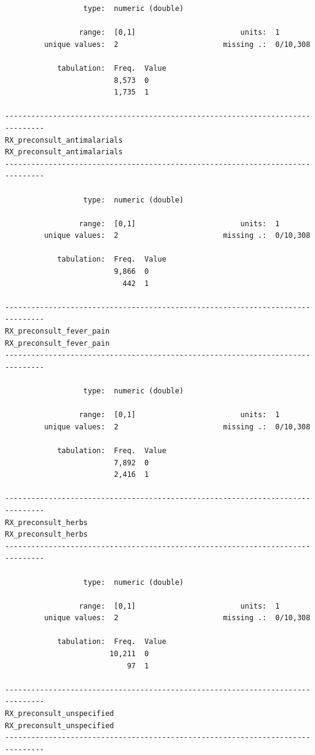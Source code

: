 \documentclass[
  letterpaper,
  DIV=11,
  numbers=noendperiod]{scrreprt}
\begin{document}
\begin{verbatim}
                  type:  numeric (double)

                 range:  [0,1]                        units:  1
         unique values:  2                        missing .:  0/10,308

            tabulation:  Freq.  Value
                         8,573  0
                         1,735  1

-------------------------------------------------------------------------------
RX_preconsult_antimalarials                         RX_preconsult_antimalarials
-------------------------------------------------------------------------------

                  type:  numeric (double)

                 range:  [0,1]                        units:  1
         unique values:  2                        missing .:  0/10,308

            tabulation:  Freq.  Value
                         9,866  0
                           442  1

-------------------------------------------------------------------------------
RX_preconsult_fever_pain                               RX_preconsult_fever_pain
-------------------------------------------------------------------------------

                  type:  numeric (double)

                 range:  [0,1]                        units:  1
         unique values:  2                        missing .:  0/10,308

            tabulation:  Freq.  Value
                         7,892  0
                         2,416  1

-------------------------------------------------------------------------------
RX_preconsult_herbs                                         RX_preconsult_herbs
-------------------------------------------------------------------------------

                  type:  numeric (double)

                 range:  [0,1]                        units:  1
         unique values:  2                        missing .:  0/10,308

            tabulation:  Freq.  Value
                        10,211  0
                            97  1

-------------------------------------------------------------------------------
RX_preconsult_unspecified                             RX_preconsult_unspecified
-------------------------------------------------------------------------------


\end{verbatim}
\end{document}
